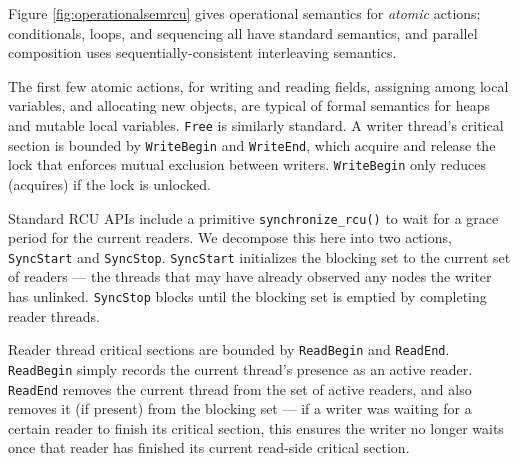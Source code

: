Figure \ref{fig:operationalsemrcu} gives operational semantics for \emph{atomic} actions; conditionals, loops, and sequencing all have standard semantics, and parallel composition uses sequentially-consistent interleaving semantics.

The first few atomic actions, for writing and reading fields, assigning among local variables, and allocating new objects, are typical of formal semantics for heaps and mutable local variables. \lstinline|Free| is similarly standard.
%
A writer thread's critical section is bounded by \lstinline|WriteBegin| and \lstinline|WriteEnd|, which acquire and release the lock that enforces mutual exclusion between writers.  \lstinline|WriteBegin| only reduces (acquires) if the lock is \textsf{unlocked}.

Standard RCU APIs include a primitive \texttt{synchronize\_rcu()} to wait for a grace period for the current readers.  We decompose this here into two actions, \lstinline|SyncStart| and \lstinline|SyncStop|.
\lstinline|SyncStart| initializes the blocking set to the current set of readers --- the threads that may have already observed any nodes the writer has unlinked.
\lstinline|SyncStop| blocks until the blocking set is emptied by completing reader threads.

Reader thread critical sections are
bounded by \lstinline|ReadBegin| and \lstinline|ReadEnd|.  \lstinline|ReadBegin| simply records the current thread's presence as an active reader.
\lstinline|ReadEnd| removes the current thread from the set of active readers, and also removes it (if present) from the blocking set --- if a writer was waiting for a certain reader to finish its critical section, this ensures the writer no longer waits once that reader has finished its current read-side critical section.


